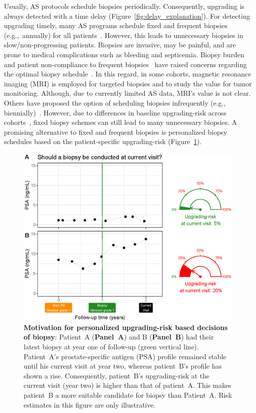 Usually, AS protocols schedule biopsies periodically. Consequently, upgrading is always detected with a time delay (Figure~\ref{fig:delay_explanation}). For detecting upgrading timely, many AS programs schedule fixed and frequent biopsies (e.g.,~annually) for all patients~\citep{nieboer2018active,loeb2014heterogeneity}. However, this leads to unnecessary biopsies in slow/non-progressing patients. Biopsies are invasive, may be painful, and are prone to medical complications such as bleeding and septicemia\citep{loeb2013systematic}. Biopsy burden and patient non-compliance to frequent biopsies~\citep{bokhorst2015compliance} have raised concerns regarding the optimal biopsy schedule~\citep{inoue2018comparative, bratt2013study}. In this regard, in some cohorts, magnetic resonance imaging (MRI) is employed for targeted biopsies and to study the value for tumor monitoring. Although, due to currently limited AS data, MRI's value is not clear. Others have proposed the option of scheduling biopsies infrequently (e.g., biennially)~\citep{inoue2018comparative,de2017estimating}. However, due to differences in baseline upgrading-risk across cohorts~\citep{inoue2018comparative}, fixed biopsy schemes can still lead to many unnecessary biopsies. A promising alternative to fixed and frequent biopsies is personalized biopsy schedules based on the patient-specific upgrading-risk (Figure~\ref{fig:riskBasedExample}).

\begin{figure}
\centerline{\includegraphics[width=\columnwidth]{images/riskBasedExample.eps}}
\caption{\textbf{Motivation for personalized upgrading-risk based decisions of biopsy}: Patient~A (\textbf{Panel~A}) and B (\textbf{Panel~B}) had their latest biopsy at year one of follow-up (green vertical line). Patient~A's prostate-specific antigen (PSA) profile remained stable until his current visit at year two, whereas patient~B's profile has shown a rise. Consequently, patient~B's upgrading-risk at the current visit (year two) is higher than that of patient~A. This makes patient~B a more suitable candidate for biopsy than Patient~A. Risk estimates in this figure are only illustrative.}
\label{fig:riskBasedExample}
\end{figure}

